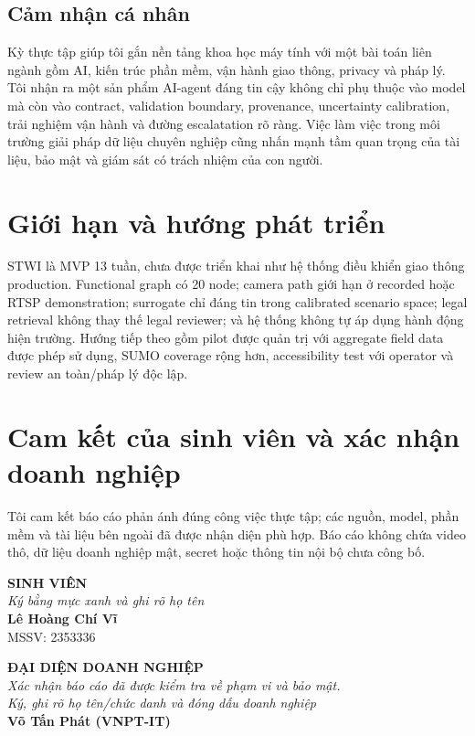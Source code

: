 \documentclass[12pt,a4paper]{report}
\newcommand{\enterpriseMentor}{Võ Tấn Phát (VNPT-IT)}
\begin{document}
\section{Cảm nhận cá nhân}
Kỳ thực tập giúp tôi gắn nền tảng khoa học máy tính với một bài toán liên ngành gồm AI, kiến trúc phần mềm, vận hành giao thông, privacy và pháp lý. Tôi nhận ra một sản phẩm AI-agent đáng tin cậy không chỉ phụ thuộc vào model mà còn vào contract, validation boundary, provenance, uncertainty calibration, trải nghiệm vận hành và đường escalatation rõ ràng. Việc làm việc trong môi trường giải pháp dữ liệu chuyên nghiệp cũng nhấn mạnh tầm quan trọng của tài liệu, bảo mật và giám sát có trách nhiệm của con người.

\chapter{Giới hạn và hướng phát triển}
STWI là MVP 13 tuần, chưa được triển khai như hệ thống điều khiển giao thông production. Functional graph có 20 node; camera path giới hạn ở recorded hoặc RTSP demonstration; surrogate chỉ đáng tin trong calibrated scenario space; legal retrieval không thay thế legal reviewer; và hệ thống không tự áp dụng hành động hiện trường. Hướng tiếp theo gồm pilot được quản trị với aggregate field data được phép sử dụng, SUMO coverage rộng hơn, accessibility test với operator và review an toàn/pháp lý độc lập.

\chapter*{Cam kết của sinh viên và xác nhận doanh nghiệp}
Tôi cam kết báo cáo phản ánh đúng công việc thực tập; các nguồn, model, phần mềm và tài liệu bên ngoài đã được nhận diện phù hợp. Báo cáo không chứa video thô, dữ liệu doanh nghiệp mật, secret hoặc thông tin nội bộ chưa công bố.

\vspace{0.7cm}
\noindent
\begin{minipage}[t]{0.46\textwidth}
\centering
\textbf{SINH VIÊN}\\[0.1cm]
\textit{Ký bằng mực xanh và ghi rõ họ tên}\\[2.6cm]
\textbf{Lê Hoàng Chí Vĩ}\\
MSSV: 2353336
\end{minipage}
\hfill
\begin{minipage}[t]{0.46\textwidth}
\centering
\textbf{ĐẠI DIỆN DOANH NGHIỆP}\\[0.1cm]
\textit{Xác nhận báo cáo đã được kiểm tra về phạm vi và bảo mật.}\\[0.2cm]
\textit{Ký, ghi rõ họ tên/chức danh và đóng dấu doanh nghiệp}\\[2.0cm]
\textbf{\enterpriseMentor}
\end{minipage}
\end{document}

